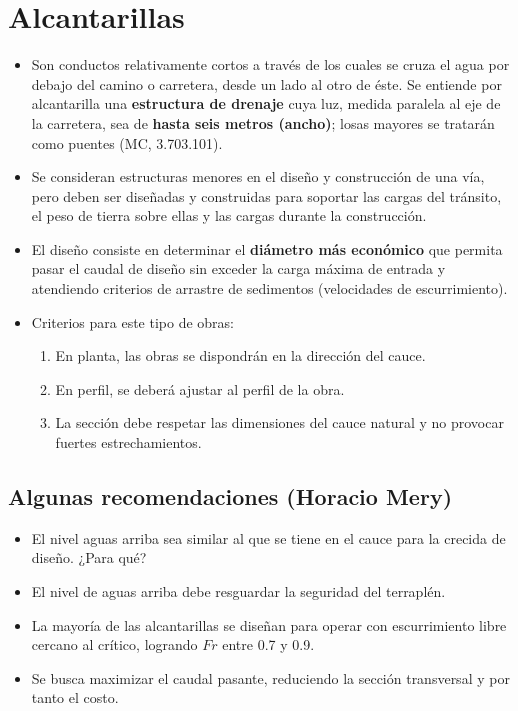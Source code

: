 \section{Alcantarillas}
\begin{itemize}
  \item Son conductos relativamente cortos a través de los cuales se cruza el
        agua por debajo del camino o carretera, desde un lado al otro de éste.
        Se entiende por alcantarilla una \textbf{estructura de drenaje} cuya
        luz, medida paralela al eje de la carretera, sea de \textbf{hasta seis
        metros (ancho)}; losas mayores se tratarán como puentes (MC, 3.703.101).
  \item Se consideran estructuras menores en el diseño y construcción de una
        vía, pero deben ser diseñadas y construidas para soportar las cargas
        del tránsito, el peso de tierra sobre ellas y las cargas durante la construcción.
  \item El diseño consiste en determinar el \textbf{diámetro más económico}
        que permita pasar el caudal de diseño sin exceder la carga máxima de
        entrada y atendiendo criterios de arrastre de sedimentos (velocidades
        de escurrimiento).
  \item Criterios para este tipo de obras:
  \begin{enumerate}[label=\alph*)]
    \item En planta, las obras se dispondrán en la dirección del cauce.
    \item En perfil, se deberá ajustar al perfil de la obra.
    \item La sección debe respetar las dimensiones del cauce natural y no
          provocar fuertes estrechamientos.
  \end{enumerate}
\end{itemize}

\subsection{Algunas recomendaciones (Horacio Mery)}
\begin{itemize}
  \item El nivel aguas arriba sea similar al que se tiene en el cauce para la
        crecida de diseño. ¿Para qué?
  \item El nivel de aguas arriba debe resguardar la seguridad del terraplén.
  \item La mayoría de las alcantarillas se diseñan para operar con
        escurrimiento libre cercano al crítico, logrando $Fr$ entre 0.7 y 0.9.
  \item Se busca maximizar el caudal pasante, reduciendo la sección
        transversal y por tanto el costo.
\end{itemize}


